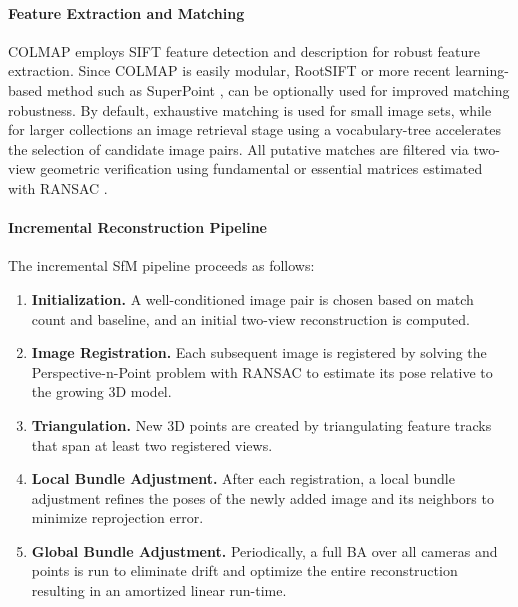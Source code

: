 \paragraph{Feature Extraction and Matching}
COLMAP employs SIFT \cite{Lowe2004DistinctiveIF} feature detection and description for robust feature extraction. 
Since COLMAP is easily modular, RootSIFT \cite{arrandjelovic2012three} or more recent learning-based method such as SuperPoint \cite{detone18superpoint}, can be optionally used for improved matching robustness.
By default, exhaustive matching is used for small image sets, while for larger collections an image retrieval stage using a vocabulary-tree accelerates the selection of candidate image pairs. 
All putative matches are filtered via two-view geometric verification using fundamental or essential matrices estimated with RANSAC \cite{fischler1981random}.

\paragraph{Incremental Reconstruction Pipeline}
The incremental SfM pipeline proceeds as follows:
\begin{enumerate}
  \item \textbf{Initialization.} A well-conditioned image pair is chosen based on match count and baseline, and an initial two-view reconstruction is computed.
  \item \textbf{Image Registration.} Each subsequent image is registered by solving the Perspective-n-Point problem with RANSAC to estimate its pose relative to the growing 3D model.
  \item \textbf{Triangulation.} New 3D points are created by triangulating feature tracks that span at least two registered views.
  \item \textbf{Local Bundle Adjustment.} After each registration, a local bundle adjustment refines the poses of the newly added image and its neighbors to minimize reprojection error.
  \item \textbf{Global Bundle Adjustment.} Periodically, a full BA over all cameras and points is run to eliminate drift and optimize the entire reconstruction resulting in an amortized linear run-time.
\end{enumerate}


